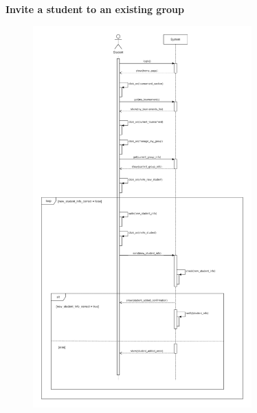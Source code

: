 \documentclass[../RASD.tex]{subfiles}
\begin{document}
    \textbf{Invite a student to an existing group}
    \begin{figure}[h!]
        \centering
        \includegraphics[width=0.75\textwidth]{../assets/section_3/InviteAStudentToAnExistingGroup.png}
    \end{figure}
    \newpage
    \restoregeometry
\end{document}
